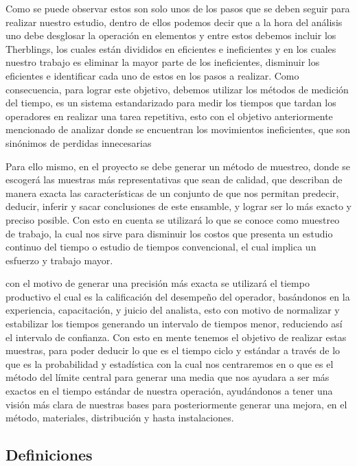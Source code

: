     Como se puede observar estos son solo unos de los pasos que se deben seguir para realizar nuestro estudio, dentro de ellos podemos decir que a la hora del análisis uno debe desglosar la operación en elementos y entre estos debemos incluir los Therblings, los cuales están divididos en eficientes e ineficientes y en los cuales nuestro trabajo es eliminar la mayor parte de los ineficientes, disminuir los eficientes e identificar cada uno de estos en los pasos a realizar. Como consecuencia, para lograr este objetivo, debemos utilizar los métodos de medición del tiempo, es un sistema estandarizado para medir los tiempos que tardan los operadores en realizar una tarea repetitiva, esto con el objetivo anteriormente mencionado de analizar donde se encuentran los movimientos ineficientes, que son sinónimos de perdidas innecesarias \cite{DanielGrifol}
    
    Para ello mismo, en el proyecto se debe generar un método de muestreo, donde se escogerá las muestras más representativas que sean de calidad, que describan de manera exacta las características de un conjunto de que nos permitan predecir, deducir, inferir y sacar conclusiones de este ensamble, y lograr ser lo más exacto y preciso posible. Con esto en cuenta se utilizará lo que se conoce como muestreo de trabajo, la cual nos sirve para disminuir los costos que presenta un estudio continuo del tiempo o estudio de tiempos convencional, el cual implica un esfuerzo y trabajo mayor.
    
    con el motivo de generar una precisión más exacta se utilizará el tiempo productivo el cual es la calificación del desempeño del operador, basándonos en la experiencia, capacitación, y juicio del analista, esto con motivo de normalizar y estabilizar los tiempos generando un intervalo de tiempos menor, reduciendo así el intervalo de confianza. Con esto en mente tenemos el objetivo de realizar estas muestras, para poder deducir lo que es el tiempo ciclo y estándar a través de lo que es la probabilidad y estadística con la cual nos centraremos en o que es el método del límite central para generar una media que nos ayudara a ser más exactos en el tiempo estándar de nuestra operación, ayudándonos a tener una visión más clara de nuestras bases para posteriormente generar una mejora, en el método, materiales, distribución y hasta instalaciones.
    
    \subsection{Definiciones}
    

